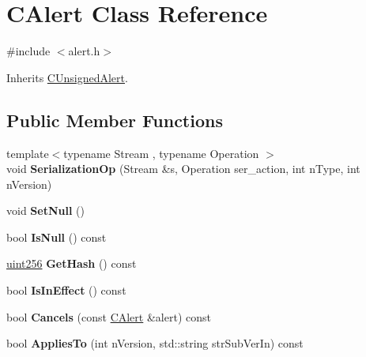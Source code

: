 \hypertarget{class_c_alert}{}\section{C\+Alert Class Reference}
\label{class_c_alert}


{\ttfamily \#include $<$alert.\+h$>$}



Inherits \mbox{\hyperlink{class_c_unsigned_alert}{C\+Unsigned\+Alert}}.

\subsection*{Public Member Functions}
\begin{DoxyCompactItemize}
\item 
\mbox{\label{class_c_alert_a51d73ab316bb42e65b87ec14ac536b14}} 
{\footnotesize template$<$typename Stream , typename Operation $>$ }\\void {\bfseries Serialization\+Op} (Stream \&s, Operation ser\+\_\+action, int n\+Type, int n\+Version)
\item 
\mbox{\label{class_c_alert_a93fd881c55ab448213787f49e316eb99}} 
void {\bfseries Set\+Null} ()
\item 
\mbox{\label{class_c_alert_a9c728b7fe91e74c51116a23b07d6978a}} 
bool {\bfseries Is\+Null} () const
\item 
\mbox{\label{class_c_alert_a059c136c9556e5e59a1a4dc39a97366d}} 
\mbox{\hyperlink{classuint256}{uint256}} {\bfseries Get\+Hash} () const
\item 
\mbox{\label{class_c_alert_a018da40779a5c095c38bf10f4256cee6}} 
bool {\bfseries Is\+In\+Effect} () const
\item 
\mbox{\label{class_c_alert_a75777afd3418c6cd74f7e9e4caed3472}} 
bool {\bfseries Cancels} (const \mbox{\hyperlink{class_c_alert}{C\+Alert}} \&alert) const
\item 
\mbox{\label{class_c_alert_a75a0fea5dc20ad704d10496f2ef0d419}} 
bool {\bfseries Applies\+To} (int n\+Version, std\+::string str\+Sub\+Ver\+In) const
\item 

\end{DoxyCompactItemize}
